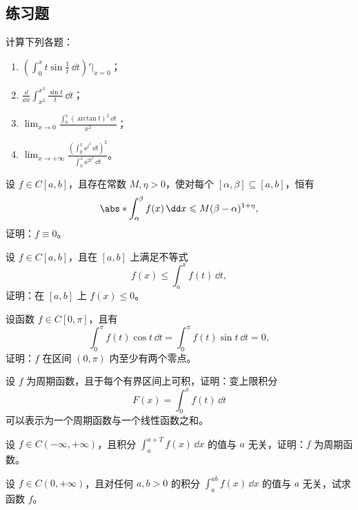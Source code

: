 \subsection{练习题}

\begin{xexercise}[1]
计算下列各题：
\begin{enumerate}[label=(\arabic*)]
  \item $\displaystyle\left(\int_0^x t\sin\frac1t\,\dd t\right)'\Big|_{x=0}$；
  \item $\displaystyle\frac{\dd}{\dd x}\int_{x^2}^{x^3}\frac{\sin t}{t}\,\dd t$；
  \item $\displaystyle\lim_{x\to0}\frac{\int_0^x(\arctan t)^2\,\dd t}{x^2}$；
  \item $\displaystyle\lim_{x\to+\infty}\frac{\left(\int_0^x\ee^{t^2}\,\dd t\right)^2}{\int_0^x\ee^{2t^2}\,\dd t}$。
\end{enumerate}
\end{xexercise}

\begin{xexercise}[2]
设 $f\in C[a,b]$，且存在常数 $M,\eta>0$，使对每个 $[\alpha,\beta]\subseteq[a,b]$，恒有
\[
  \abs*{\int_\alpha^\beta f(x)\,\dd x}\leqslant M(\beta-\alpha)^{1+\eta},
\]
证明：$f\equiv0$。
\end{xexercise}

\begin{xexercise}[3]
设 $f\in C[a,b]$，且在 $[a,b]$ 上满足不等式
\[
  f(x)\leqslant\int_a^x f(t)\,\dd t,
\]
证明：在 $[a,b]$ 上 $f(x)\leqslant0$。
\end{xexercise}

\begin{xexercise}[4]
设函数 $f\in C[0,\pi]$，且有
\[
  \int_0^\pi f(t)\cos t\,\dd t=\int_0^\pi f(t)\sin t\,\dd t=0,
\]
证明：$f$ 在区间 $(0,\pi)$ 内至少有两个零点。
\end{xexercise}

\begin{xexercise}[5]
设 $f$ 为周期函数，且于每个有界区间上可积，证明：变上限积分
\[
  F(x)=\int_0^x f(t)\,\dd t
\]
可以表示为一个周期函数与一个线性函数之和。
\end{xexercise}

\begin{xexercise}[6]
设 $f\in C(-\infty,+\infty)$，且积分 $\int_a^{a+T}f(x)\,\dd x$ 的值与 $a$ 无关，证明：$f$ 为周期函数。
\end{xexercise}

\begin{xexercise}[7]
设 $f\in C(0,+\infty)$，且对任何 $a,b>0$ 的积分 $\int_a^{ab}f(x)\,\dd x$ 的值与 $a$ 无关，试求函数 $f$。
\end{xexercise}


